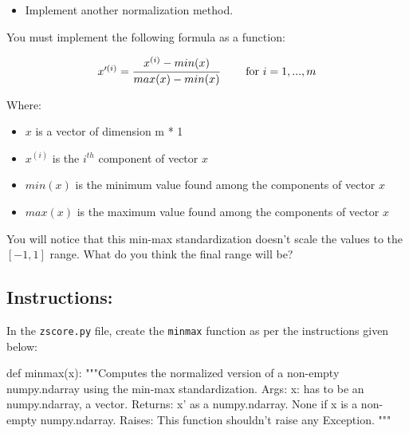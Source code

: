 \documentclass[]{article}
\newenvironment{Shaded}{\begin{snugshade}}{\end{snugshade}}
\newcommand{\CommentTok}[1]{\textcolor[rgb]{0.48,0.49,0.49}{#1}}
\newcommand{\KeywordTok}[1]{\textcolor[rgb]{0.81,0.81,0.76}{#1}}
\newcommand{\NormalTok}[1]{\textcolor[rgb]{0.81,0.81,0.76}{#1}}
\providecommand{\tightlist}{%
  \setlength{\itemsep}{0pt}\setlength{\parskip}{0pt}}
\begin{document}
\begin{itemize}
\tightlist
\item
  Implement another normalization method.
\end{itemize}

You must implement the following formula as a function:

\large

\[
\begin{matrix}
x'^{(i)} = \cfrac{x^{(i)} - min(x)}{max(x) - min(x)} & & \text{ for $i = 1, ..., m$}
\end{matrix}
\] \normalsize

Where:

\begin{itemize}
\item
  \(x\) is a vector of dimension m * 1
\item
  \(x^{(i)}\) is the \(i^{th}\) component of vector \(x\)
\item
  \(min(x)\) is the minimum value found among the components of vector
  \(x\)
\item
  \(max(x)\) is the maximum value found among the components of vector
  \(x\)
\end{itemize}

You will notice that this min-max standardization doesn't scale the
values to the \([-1,1]\) range. What do you think the final range will
be?

\hypertarget{instructions-8}{%
\subsection{Instructions:}\label{instructions-8}}

In the \texttt{zscore.py} file, create the \texttt{minmax} function as
per the instructions given below:

\begin{Shaded}
\begin{Highlighting}[]
\KeywordTok{def}\NormalTok{ minmax(x):}
    \CommentTok{"""Computes the normalized version of a non-empty numpy.ndarray using the min-max standardization.}
\CommentTok{    Args:}
\CommentTok{      x: has to be an numpy.ndarray, a vector.}
\CommentTok{    Returns:}
\CommentTok{      x' as a numpy.ndarray. }
\CommentTok{      None if x is a non-empty numpy.ndarray.}
\CommentTok{    Raises:}
\CommentTok{      This function shouldn't raise any Exception.}
\CommentTok{    """}
\end{Highlighting}
\end{Shaded}
\end{document}
